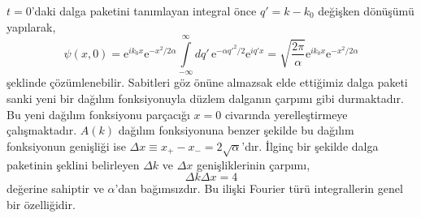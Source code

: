 \documentclass[00_kitap.tex]{subfiles}
\begin{document}
$t=0$'daki dalga paketini tanımlayan integral önce $q' = k-k_0$ değişken dönüşümü yapılarak,
\begin{equation}
\psi(x, 0) = \text{e}^{ik_0x} \text{e}^{-x^2/2\alpha} \int\limits_{-\infty}^{\infty}dq' \, \text{e}^{-\alpha q'^2/2} \text{e}^{iq'x}= \sqrt{\frac{2\pi}{\alpha}} \text{e}^{ik_0x} \text{e}^{-x^2/2\alpha}
\label{eq:wave_packet_t0}
\end{equation}
şeklinde çözümlenebilir. Sabitleri göz önüne almazsak elde ettiğimiz dalga paketi sanki yeni bir dağılım fonksiyonuyla düzlem dalganın çarpımı gibi durmaktadır. Bu yeni dağılım fonksiyonu parçacığı $x=0$ civarında yerelleştirmeye çalışmaktadır. $A(k)$ dağılım fonksiyonuna benzer şekilde bu dağılım fonksiyonun genişliği ise $\Delta x \equiv  x_{+} - x_{-} = 2\sqrt{\alpha}$'dır. İlginç bir şekilde dalga paketinin şeklini belirleyen $\Delta k$ ve $\Delta x$ genişliklerinin çarpımı,
\begin{equation}
\Delta k  \Delta x  = 4
\label{eq:del_x_k}
\end{equation}
değerine sahiptir ve $\alpha$'dan bağımsızdır. Bu ilişki Fourier türü integrallerin genel bir özelliğidir.
\end{document}

